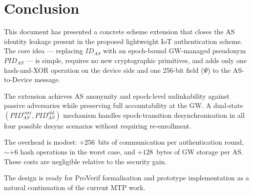 \documentclass[12pt,a4paper]{article}
\newcommand{\IDas}{\mathit{ID}_{AS}}
\newcommand{\PIDas}{\mathit{PID}_{AS}}
\newcommand{\PIDascurr}{\mathit{PID}_{AS}^{\mathrm{curr}}}
\newcommand{\PIDASOld}{\mathit{PID}_{AS}^{\mathrm{old}}}
\begin{document}
\section{Conclusion}

This document has presented a concrete scheme extension that closes
the AS identity leakage present in the proposed lightweight IoT
authentication scheme.
The core idea --- replacing $\IDas$ with an epoch-bound GW-managed
pseudonym $\PIDas$ --- is simple, requires no new cryptographic
primitives, and adds only one hash-and-XOR operation on the device
side and one 256-bit field ($\Psi$) to the AS-to-Device message.

The extension achieves AS anonymity and epoch-level unlinkability
against passive adversaries while preserving full accountability
at the GW.  A dual-state $(\PIDascurr, \PIDASOld)$ mechanism handles
epoch-transition desynchronisation in all four possible desync
scenarios without requiring re-enrollment.

The overhead is modest: $+256$~bits of communication per authentication
round, $\sim+6$ hash operations in the worst case, and $+128$~bytes
of GW storage per AS.  These costs are negligible relative to the
security gain.

The design is ready for ProVerif formalisation and prototype
implementation as a natural continuation of the current MTP work.



\end{document}

